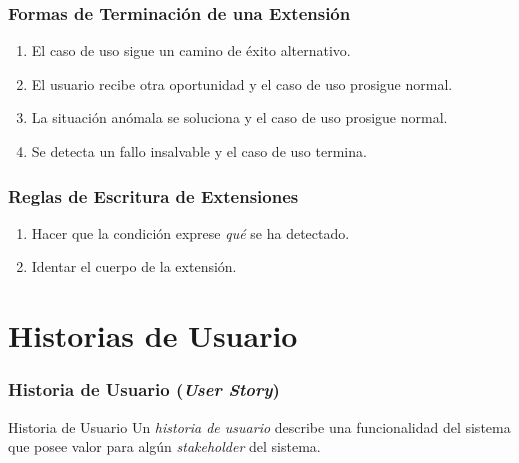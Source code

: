 \documentclass[handout,slidestop,xcolor=pst,dvips,blue]{beamer}
\begin{document}
\begin{frame}[c]
    \frametitle{Formas de Terminación de una Extensión}
    \begin{enumerate}[<+->]
        \item El caso de uso sigue un camino de éxito alternativo.
        \item El usuario recibe otra oportunidad y el caso de uso prosigue normal.
        \item La situación anómala se soluciona y el caso de uso prosigue normal.
        \item Se detecta un fallo insalvable y el caso de uso termina.
     \end{enumerate}
\end{frame}

\begin{frame}[c]
    \frametitle{Reglas de Escritura de Extensiones}
    \begin{enumerate}[<+->]
        \item Hacer que la condición exprese \alert{\emph{qué}} se ha detectado.
        \item Identar el cuerpo de la extensión.
    \end{enumerate}
\end{frame}

\section{Historias de Usuario}

\begin{frame}[c]
	\frametitle{Historia de Usuario (\emph{User Story})}
	\begin{block}{Historia de Usuario}
        Un \emph{historia de usuario} describe una funcionalidad del sistema que posee valor para algún \emph{stakeholder} del sistema.
	\end{block}
\end{frame}
\end{document}
